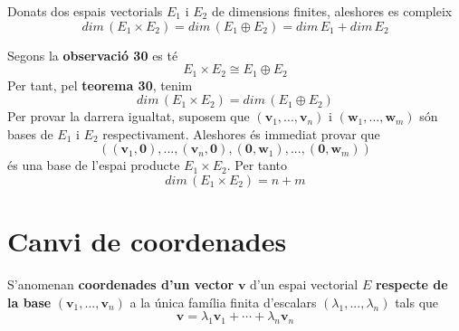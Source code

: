 \begin{corollari}
Donats dos espais vectorials $E_{1}$ i $E_{2}$ de
dimensions finites, aleshores es compleix 
\begin{equation*}
dim \,(E_{1}\times E_{2})=dim\,(E_{1}\oplus 
E_{2})=dim\,E_{1} + dim\,E_{2}
\end{equation*}

\end{corollari}
\begin{prova}
Segons la \textbf{observació 30} es té 
\begin{equation*}
E_{1}\times E_{2}\cong E_{1}\oplus E_{2}
\end{equation*}%
Per tant, pel \textbf{teorema 30}, tenim 
\begin{equation*}
dim\,(E_{1}\times E_{2})=dim\,(E_{1}\oplus 
E_{2})
\end{equation*}%
Per provar la darrera igualtat, suposem que $(\mathbf{v}_{1},...,%
\mathbf{v}_{n})$ i $(\mathbf{w}_{1},...,\mathbf{w}_{m})$ són bases de $%
E_{1}$ i $E_{2}$ respectivament. Aleshores és immediat
provar que 
\begin{equation*}
((\mathbf{v}_{1},\mathbf{0}),...,(\mathbf{v}_{n},\mathbf{0}),(\mathbf{0},%
\mathbf{w}_{1}),...,(\mathbf{0},\mathbf{w}_{m}))
\end{equation*}%
és una base de l’espai producte $E_{1}\times E_{2}$. Per
tanto 
\begin{equation*}
dim\,(E_{1}\times E_{2})=n+m
\end{equation*}
\end{prova}

\section{Canvi de coordenades}

\begin{definicio}
S’anomenan \textbf{coordenades d’un vector} $\mathbf{v}$ d’un espai
vectorial $E$ \textbf{respecte de la base} $(\mathbf{v}_{1},..., 
\mathbf{v}_{n})$ a la única família finita d'escalars $(\lambda
_{1},...,\lambda _{n})$ tals que%
\begin{equation*}
\mathbf{v}=\lambda _{1}\mathbf{v}_{1}+\cdots +\lambda _{n}\mathbf{v}_{n}
\end{equation*}
\end{definicio}

